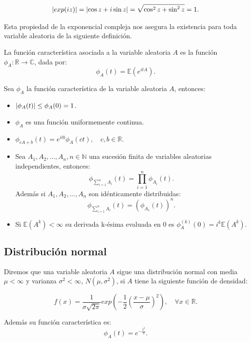 \documentclass[../proyecto.tex]{memoir}
\begin{document}
$$
\abs{ exp(iz) } = \abs{\cos z+i\sin z} = \sqrt{\cos^2 z + \sin^2 z} = 1.
$$

Esta propiedad de la exponencial compleja nos asegura la existencia para toda variable aleatoria de la siguiente definición.

\begin{defi}
La función característica asociada a la variable aleatoria $A$ es la función $\phi_{A}: \mathds{R} \to \mathds{C}$, dada por:
$$
\phi_{A}(t) = \mathds{E}(e^{itA}).
$$
\end{defi}

\begin{prop}
Sea $\phi_A$ la función característica de la variable aleatoria $A$, entonces:

\begin{itemize}
\item $\abs{\phi_A(t)} \leq \phi_A(0)=1$.
\item $\phi_A$ es una función uniformemente continua.
\item $\phi_{cA+b}(t)=e^{itb}\phi_A(ct), \quad c,b\in \mathds{R}$.
\item Sea $A_1, A_2,...,A_n, n\in\mathds{N}$ una sucesión finita de variables aleatorias independientes, entonces: $$ 
\phi_{\sum^{n}_{i=1} A_i} (t) = \prod_{i=1}^{n} \phi_{A_i} (t) .
$$ Además si $A_1, A_2,...,A_n$ son idénticamente distribuidas: $$
\phi_{\sum^{n}_{i=1} A_i} (t) = \left( \phi_{A_1}(t) \right)^{n}.
$$
\item Si $\mathds{E}(A^k) < \infty$ su derivada k-ésima evaluada en 0 es $\phi_A^{(k)}(0)=i^k\mathds{E}(A^k)$.
\end{itemize}

\end{prop}

\subsection{Distribución normal}

\begin{defi} \label{normal}
Diremos que una variable aleatoria $A$ sigue una distribución normal con media $\mu < \infty$ y varianza $\sigma^2 < \infty$, $N(\mu,\sigma^2)$, si $A$ tiene la siguiente función de densidad: 

$$
f(x) = \frac{1}{ \sigma \sqrt{ 2 \pi }} exp \left( -\frac{1}{2}\left( \frac{x-\mu}{\sigma} \right)^2 \right),\quad \forall x \in \mathds{R}.
$$

Además su función característica es: $$
 \phi_{A}(t)=e^{-\frac{t^2}{2}}.
$$
\end{defi}
\end{document}
